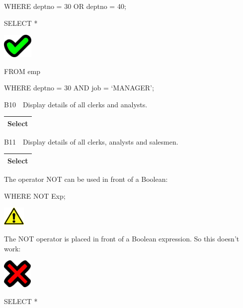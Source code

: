 WHERE deptno = 30 OR deptno = 40;

SELECT  *

\begin{center}
  
\includegraphics[width=1.443cm,height=1.184cm]{images/img (27).png}

\end{center}
FROM  emp

WHERE deptno = 30 AND job = `MANAGER';

B10\ \ Display details of all clerks and analysts.  

\begin{flushleft}
\tablefirsthead{}
\tablehead{}
\tabletail{}
\tablelasttail{}
\begin{supertabular}{|m{14.303cm}|}
\hline
Select 

\\\hline
\end{supertabular}
\end{flushleft}
B11\ \ Display details of all clerks, analysts and salesmen.

\begin{flushleft}
\tablefirsthead{}
\tablehead{}
\tabletail{}
\tablelasttail{}
\begin{supertabular}{|m{14.303cm}|}
\hline
Select 

\\\hline
\end{supertabular}
\end{flushleft}
The operator NOT can be used in front of a Boolean:

WHERE NOT Exp;



\begin{center}
  
\includegraphics[width=1.06cm,height=0.903cm]{images/img (2).png}

\end{center}
The NOT operator is placed in front of a Boolean expression. So this doesn't work:



\begin{center}
  
\includegraphics[width=1.443cm,height=1.427cm]{images/img (26).png}

\end{center}
SELECT  *

